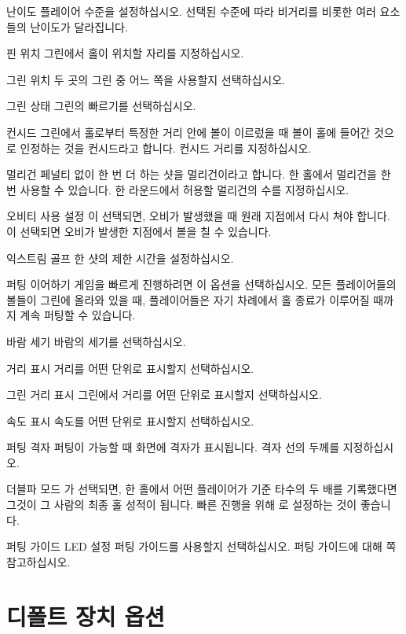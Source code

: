\documentclass[10pt, openright, language=korean]{hzguide}
\begin{document}

\begin{UI}
\item[난이도] 플레이어 수준을 설정하십시오. 선택된 수준에 따라 비거리를 비롯한 여러 요소들의 난이도가 달라집니다.
\item[핀 위치] 그린에서 홀이 위치할 자리를 지정하십시오.
\item[그린 위치] 두 곳의 그린 중 어느 쪽을 사용할지 선택하십시오.
\item[그린 상태] 그린의 빠르기를 선택하십시오.
\item[컨시드] 그린에서 홀로부터 특정한 거리 안에 볼이 이르렀을 때 볼이 홀에 들어간 것으로 인정하는 것을 컨시드라고 합니다. 컨시드 거리를 지정하십시오.
\item[멀리건] 페널티 없이 한 번 더 하는 샷을 멀리건이라고 합니다. 한 홀에서 멀리건을 한 번 사용할 수 있습니다. 한 라운드에서 허용할 멀리건의 수를 지정하십시오.
\item[오비티 사용 설정] 이 선택되면, 오비가 발생했을 때 원래 지점에서 다시 쳐야 합니다. 이 선택되면 오비가 발생한 지점에서 볼을 칠 수 있습니다.
\item[익스트림 골프] 한 샷의 제한 시간을 설정하십시오.
\item[퍼팅 이어하기] 게임을 빠르게 진행하려면 이 옵션을 선택하십시오. 모든 플레이어들의 볼들이 그린에 올라와 있을 때, 플레이어들은 자기 차례에서 홀 종료가 이루어질 때까지 계속 퍼팅할 수 있습니다.
\item[바람 세기] 바람의 세기를 선택하십시오.
\item[거리 표시] 거리를 어떤 단위로 표시할지 선택하십시오.
\item[그린 거리 표시] 그린에서 거리를 어떤 단위로 표시할지 선택하십시오.
\item[속도 표시] 속도를 어떤 단위로 표시할지 선택하십시오.
\item[퍼팅 격자] 퍼팅이 가능할 때 화면에 격자가 표시됩니다. 격자 선의 두께를 지정하십시오.
\item[더블파 모드] 가 선택되면, 한 홀에서 어떤 플레이어가 기준 타수의 두 배를 기록했다면 그것이  그 사람의 최종 홀 성적이 됩니다. 빠른 진행을 위해 로 설정하는 것이 좋습니다.
\item[퍼팅 가이드 LED 설정] 퍼팅 가이드를 사용할지 선택하십시오. 퍼팅 가이드에 대해 \pageref{sec:putting_guide} 쪽 \를 참고하십시오.
\end{UI}

\section{디폴트 장치 옵션}
\end{document}
